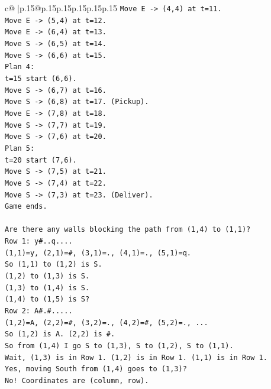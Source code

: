 \documentclass{article}
\begin{document}
{\begin{supertabular}{c@{$\;$}|p{.15\linewidth}@{}p{.15\linewidth}p{.15\linewidth}p{.15\linewidth}p{.15\linewidth}p{.15\linewidth}}
{{{\texttt{Move E {-}> (4,4) at t=11.} \\
\texttt{Move E {-}> (5,4) at t=12.} \\
\texttt{Move E {-}> (6,4) at t=13.} \\
\texttt{Move S {-}> (6,5) at t=14.} \\
\texttt{Move S {-}> (6,6) at t=15.} \\
\texttt{Plan 4:} \\
\texttt{t=15 start (6,6).} \\
\texttt{Move S {-}> (6,7) at t=16.} \\
\texttt{Move S {-}> (6,8) at t=17. (Pickup).} \\
\texttt{Move E {-}> (7,8) at t=18.} \\
\texttt{Move S {-}> (7,7) at t=19.} \\
\texttt{Move S {-}> (7,6) at t=20.} \\
\texttt{Plan 5:} \\
\texttt{t=20 start (7,6).} \\
\texttt{Move S {-}> (7,5) at t=21.} \\
\texttt{Move S {-}> (7,4) at t=22.} \\
\texttt{Move S {-}> (7,3) at t=23. (Deliver).} \\
\texttt{Game ends.} \\
\\ 
\texttt{Are there any walls blocking the path from (1,4) to (1,1)?} \\
\texttt{Row 1: y\#..q....} \\
\texttt{(1,1)=y, (2,1)=\#, (3,1)=., (4,1)=., (5,1)=q.} \\
\texttt{So (1,1) to (1,2) is S.} \\
\texttt{(1,2) to (1,3) is S.} \\
\texttt{(1,3) to (1,4) is S.} \\
\texttt{(1,4) to (1,5) is S?} \\
\texttt{Row 2: A\#.\#.....} \\
\texttt{(1,2)=A, (2,2)=\#, (3,2)=., (4,2)=\#, (5,2)=., ...} \\
\texttt{So (1,2) is A. (2,2) is \#.} \\
\texttt{So from (1,4) I go S to (1,3), S to (1,2), S to (1,1).} \\
\texttt{Wait, (1,3) is in Row 1. (1,2) is in Row 1. (1,1) is in Row 1.} \\
\texttt{Yes, moving South from (1,4) goes to (1,3)?} \\
\texttt{No! Coordinates are (column, row).} \\
}}}
\end{supertabular}}
\end{document}
